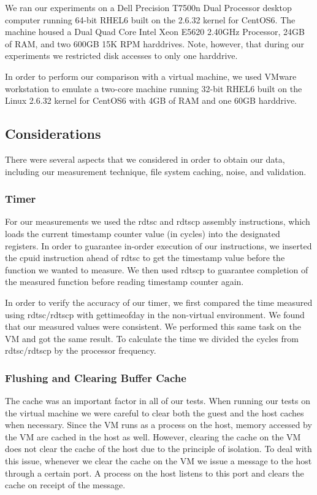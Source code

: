 We ran our experiments on a Dell Precision T7500n Dual Processor desktop 
computer running 64-bit RHEL6 built on the 2.6.32 kernel for CentOS6. The 
machine housed a Dual Quad Core Intel\textsuperscript{\textregistered} 
Xeon\textsuperscript{\textregistered} E5620 2.40GHz Processor, 24GB of RAM, 
and two 600GB 15K RPM harddrives. Note, however, that during our experiments 
we restricted disk accesses to only one harddrive.

In order to perform our comparison with a virtual machine, we used VMware 
workstation to emulate a two-core machine running 32-bit RHEL6 built on the 
Linux 2.6.32 kernel for CentOS6 with 4GB of RAM and one 60GB harddrive.

\subsection{Considerations}
There were several aspects that we considered in order to obtain our data, 
including our measurement technique, file system caching, noise, and validation.

\subsubsection{Timer}
For our measurements we used the rdtsc and rdtscp assembly instructions, which loads the current timestamp counter value (in cycles) into the designated registers. In order to guarantee in-order execution of our instructions, we inserted the cpuid instruction ahead of rdtsc to get the timestamp value before the function we wanted to measure. We then used rdtscp to guarantee completion of the measured function before reading timestamp counter again.

In order to verify the accuracy of our timer, we first compared the time measured 
using rdtsc/rdtscp with gettimeofday in the non-virtual environment. We found that 
our measured values were consistent. We performed this same task on the VM and got
the same result. To calculate the time we divided the cycles from rdtsc/rdtscp by the processor frequency.

\subsubsection{Flushing and Clearing Buffer Cache}
The cache was an important factor in all of our tests. When running our tests on the
virtual machine we were careful to clear both the guest and the host caches when 
necessary. Since the VM runs as a process on the host, memory accessed by the VM
are cached in the host as well. However, clearing the cache on the VM does not 
clear the cache of the host due to the principle of isolation. To deal with this 
issue, whenever we clear the cache on the VM we issue a message to the host through
a certain port. A process on the host listens to this port and clears the cache on
receipt of the message.

